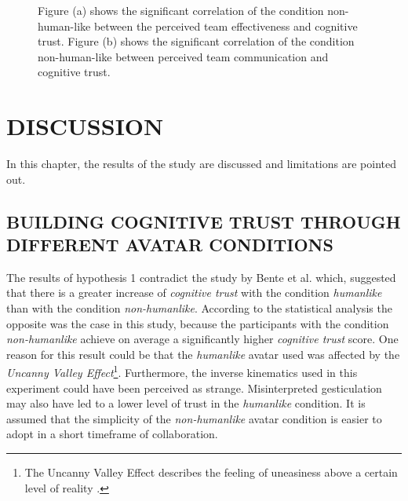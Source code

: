 \documentclass[sigchi]{acmart}
\begin{document}
\begin{figure}[]
  \centering
  \qquad
  \caption[Significant correlations Cognitive trust, Team effectiveness and Team communication]{Figure (a) shows the significant correlation of the condition non-human-like between the perceived team effectiveness and cognitive trust. Figure (b) shows the significant correlation of the condition non-human-like between perceived team communication and cognitive trust. }
  \label{SubDataCorr}
\end{figure}

\section{DISCUSSION}
In this chapter, the results of the study are discussed and limitations are pointed out.

\subsection{BUILDING COGNITIVE TRUST THROUGH DIFFERENT AVATAR CONDITIONS}
The results of hypothesis 1 contradict the study by Bente et al. \cite{bente2004social} which, suggested that there is a greater increase of \textit{cognitive trust} with the condition \textit{humanlike} than with the condition \textit{non-humanlike}. According to the statistical analysis the opposite was the case in this study, because the participants with the condition \textit{non-humanlike} achieve on average a significantly higher \textit{cognitive trust} score.
One reason for this result could be that the \textit{humanlike} avatar used was affected by the \textit{Uncanny Valley Effect}\footnote{The Uncanny Valley Effect describes the feeling of uneasiness above a certain level of reality \citep[pp. 352-353]{guest2011uncanny}.}.
Furthermore, the inverse kinematics used in this experiment could have been perceived as strange. Misinterpreted gesticulation may also have led to a lower level of trust in the \textit{humanlike} condition. It is assumed that the simplicity of the \textit{non-humanlike} avatar condition is easier to adopt in a short timeframe of collaboration.
\end{document}
